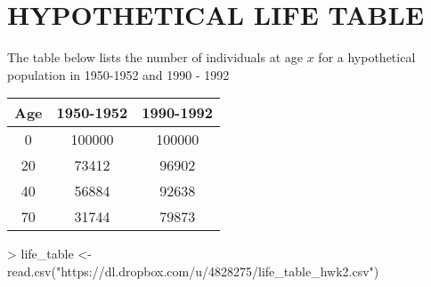\documentclass{article}
\begin{document}
\pagebreak
\section{HYPOTHETICAL LIFE TABLE}

The table below lists the number of individuals at age \(x\) for a hypothetical
population in 1950-1952 and 1990 - 1992\\

\begin{table}[ht]
\begin{center}
\begin{tabular}{ccc}
  \hline
Age & 1950-1952 & 1990-1992 \\ 
  \hline
0  & 100000 & 100000 \\ 
20 & 73412 & 96902 \\ 
40 & 56884 & 92638 \\ 
70 & 31744 & 79873 \\ 
   \hline
\end{tabular}
\end{center}
\end{table}



\begin{Schunk}
\begin{Sinput}
> life_table <- read.csv("https://dl.dropbox.com/u/4828275/life_table_hwk2.csv")
\end{Sinput}
\end{Schunk}
\end{document}
